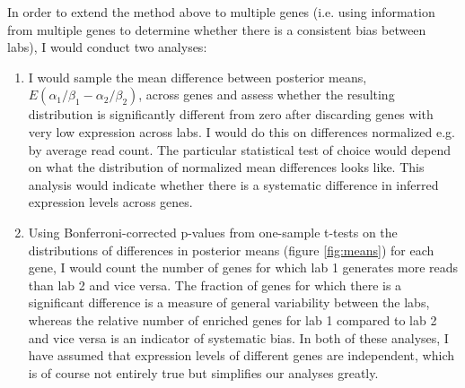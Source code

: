 \documentclass{article}
\begin{document}
In order to extend the method above to multiple genes (i.e. using information from multiple genes to determine whether there is a consistent bias between labs), I would conduct two analyses:
\begin{enumerate}
\item
I would sample the mean difference between posterior means,  $E(\alpha_1 / \beta_1 - \alpha_2 / \beta_2 )$, across genes and assess whether the resulting distribution is significantly different from zero after discarding genes with very low expression across labs. I would do this on differences normalized e.g. by average read count. The particular statistical test of choice would depend on what the distribution of normalized mean differences looks like. This analysis would indicate whether there is a systematic difference in inferred expression levels across genes.
\item
Using Bonferroni-corrected p-values from one-sample t-tests on the distributions of differences in posterior means (figure \ref{fig:means}) for each gene, I would count the number of genes for which lab 1 generates more reads than lab 2 and vice versa. The fraction of genes for which there is a significant difference is a measure of general variability between the labs, whereas the relative number of enriched genes for lab 1 compared to lab 2 and vice versa is an indicator of systematic bias. In both of these analyses, I have assumed that expression levels of different genes are independent, which is of course not entirely true but simplifies our analyses greatly.

\end{enumerate}







%
 
\end{document}
